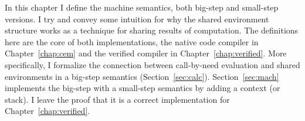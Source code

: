 In this chapter I define the \ce machine semantics, both big-step and small-step
versions. I try and convey some intuition for why the shared environment
structure works as a technique for sharing results of computation. The
definitions here are the core of both implementations, the native code compiler
in Chapter~\ref{chap:cem} and the verified compiler in
Chapter~\ref{chap:verified}. More specifically, I formalize the connection
between call-by-need evaluation and shared environments in a big-step semantics
(Section~\ref{sec:calc}).  Section~\ref{sec:mach} implements the big-step with a
small-step semantics by adding a context (or stack). I leave the proof that it
is a correct implementation for Chapter~\ref{chap:verified}.
